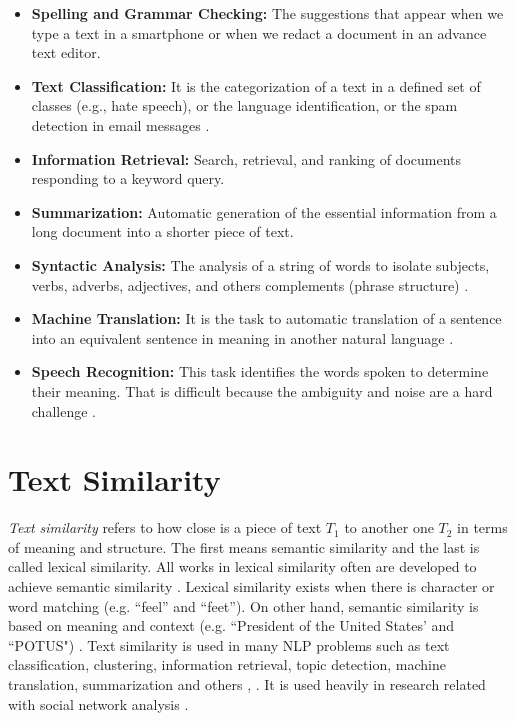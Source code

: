 \documentclass[12pt]{report}
\begin{document}
\begin{itemize}[nolistsep]
	\item \textbf{Spelling and Grammar Checking:} The suggestions that appear when we type a text in a smartphone or when we redact a document in an advance text editor. 
	
	\item \textbf{Text Classification:} It is the categorization of a text in a defined set of classes (e.g., hate speech), or the language identification, or the  spam detection in email messages \cite{Russell2010}.
	
	\item \textbf{Information Retrieval:} Search, retrieval, and ranking  of documents responding to a keyword query.
	
	\item \textbf{Summarization:} Automatic generation of  the essential information from a long document into a shorter piece of text.
	
	\item \textbf{Syntactic Analysis:} The analysis of a string of words to isolate subjects, verbs, adverbs, adjectives, and others complements (phrase structure) \cite{Russell2010}.
	
	\item \textbf{Machine Translation:} It is the task to automatic translation of a sentence into an equivalent sentence in meaning in another natural language \cite{Goodfellow2016}.
	
	\item \textbf{Speech Recognition:} This task identifies the words spoken to determine their meaning. That is difficult because the ambiguity and noise are a hard challenge \cite{Russell2010}.
	
\end{itemize}

\section{Text Similarity}
{\em Text similarity} refers to how close is a piece of text $T_1$ to another one $T_2$ in terms of meaning and structure.  The first means semantic similarity and the last is called lexical similarity. All works in lexical similarity often are developed to achieve semantic similarity \cite{Ganesan2015}.  Lexical similarity exists when there is character or word matching (e.g. ``feel'' and ``feet''). On other hand, semantic similarity is based on meaning and context (e.g. ``President of the United States' and ``POTUS") \cite{Pradhan2015}. 
Text similarity is used in many \ac{NLP} problems such as text classification, clustering, information retrieval, topic detection, machine translation, summarization and others \cite{Pradhan2015,Majumder2016}, \cite{Gomaa2013}. It is used heavily in research related with social network analysis \cite{Zhang2015}.  
\end{document}
